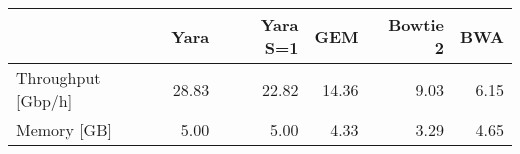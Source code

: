 \begin{tabular}{lrrrrr}
  \toprule
 & Yara & Yara S=1 & GEM & Bowtie 2 & BWA \\ 
  \midrule
Throughput [Gbp/h] & 28.83 & 22.82 & 14.36 & 9.03 & 6.15 \\ 
  Memory [GB] & 5.00 & 5.00 & 4.33 & 3.29 & 4.65 \\ 
   \bottomrule
\end{tabular}
